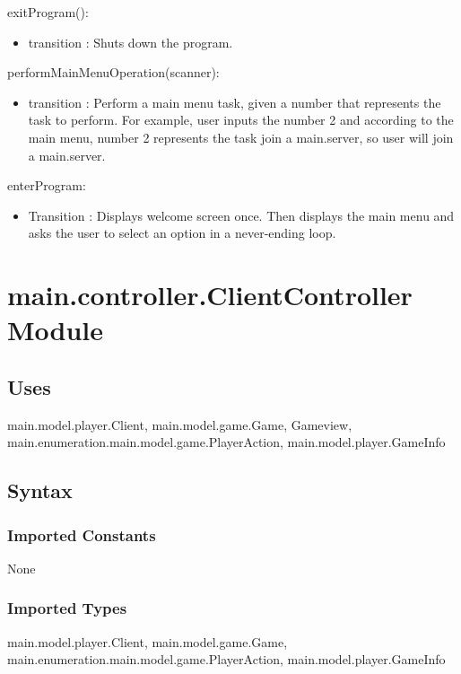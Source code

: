 \documentclass[12pt, titlepage]{article}
\begin{document}
        \noindent exitProgram():
        \begin{itemize}
        \item transition : Shuts down the program.
        \end{itemize}
        
        \noindent performMainMenuOperation(scanner):
        \begin{itemize}
        \item transition : Perform a main menu task, given a number that represents the task to perform. For example, user inputs the number 2 and according to the main menu, number 2 represents the task join a main.server, so user will join a main.server.
        \end{itemize}
        
        \noindent enterProgram:
        \begin{itemize}
        \item Transition : Displays welcome screen once. Then displays the main menu and asks the user to select an option in a never-ending loop.
        \end{itemize}
        
        
\section* {main.controller.ClientController Module}
    \subsection* {Uses}
        main.model.player.Client, main.model.game.Game, Gameview, main.enumeration.main.model.game.PlayerAction, main.model.player.GameInfo
    \subsection* {Syntax}
    
        \subsubsection* {Imported Constants}
            None
        \subsubsection* {Imported Types}
            main.model.player.Client, main.model.game.Game, main.enumeration.main.model.game.PlayerAction, main.model.player.GameInfo
\end{document}
